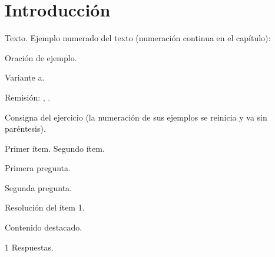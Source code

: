 
\section{Introducción}

Texto. Ejemplo numerado del texto (numeración continua en el capítulo):

\begin{exe}
  \ex\label{ex:NN-uno} Oración de ejemplo.
  \ex\label{ex:NN-dos}
    \begin{xlist}
      \ex Variante a.
    \end{xlist}
\end{exe}

Remisión: , .

\begin{ejercicio}
Consigna del ejercicio (la numeración de sus ejemplos se reinicia y va sin
paréntesis).

\begin{exe}
  \ex Primer ítem.
  \ex Segundo ítem.
\end{exe}

\begin{consignas}
  \item Primera pregunta.
  \item Segunda pregunta.
\end{consignas}

\begin{resuelto}
Resolución del ítem 1.
\end{resuelto}
\end{ejercicio}

\begin{recuadro}
Contenido destacado.
\end{recuadro}

\lecturasrecomendadas

\solucionario
\begin{solucion}{1}
Respuestas.
\end{solucion}

